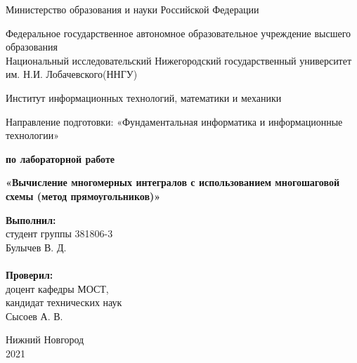 \documentclass{report}
\begin{document}
\begin{titlepage}
\begin{center}
Министерство образования и науки Российской Федерации
\end{center}
\begin{center}
Федеральное государственное автономное образовательное учреждение высшего образования \\
Национальный исследовательский Нижегородский государственный университет им. Н.И. Лобачевского(ННГУ)
\end{center}
\begin{center}
Институт информационных технологий, математики и механики
\end{center}
\begin{center}
Направление подготовки: «Фундаментальная информатика и информационные технологии»
\end{center}

\vspace{2em}

\begin{center}
\textbf{ по лабораторной работе} 
\end{center}
\begin{center}
\textbf{\Large«Вычисление многомерных интегралов с использованием многошаговой схемы (метод прямоугольников)»} \\
\end{center}

\vspace{4em}

\newbox{\lbox}
\newlength{\maxl}
\setlength{\maxl}{\wd\lbox}
\hfill\parbox{7cm}{
\textbf{Выполнил:} \\ студент группы 381806-3 \\ Булычев В. Д.\\
\\
\textbf{Проверил:}\\ доцент кафедры МОСТ, \\ кандидат технических наук \\ Сысоев А. В.\\
}
\vspace{\fill}
\begin{center} Нижний Новгород \\ 2021 \end{center}
\end{titlepage}

\setcounter{page}{2}

\tableofcontents
\newpage
\end{document}
